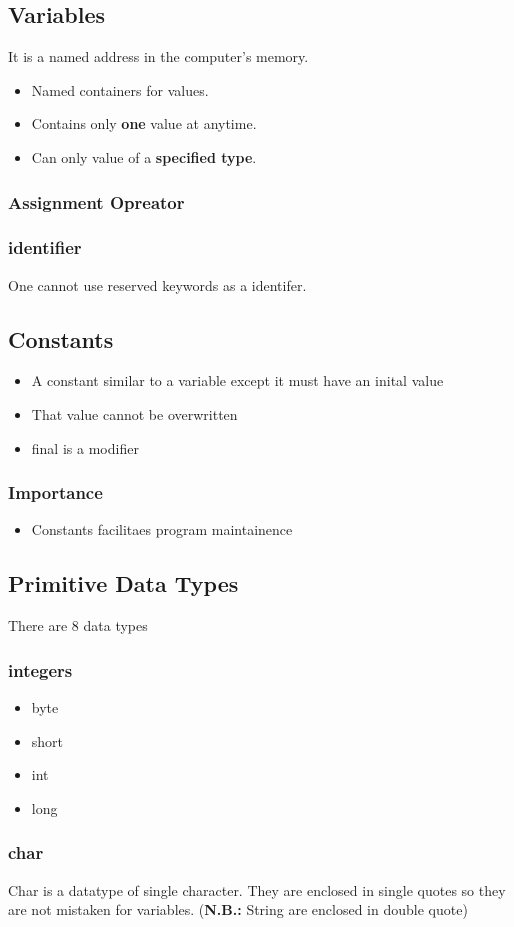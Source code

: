 \documentclass[12pt]{article}
\begin{document}
\subsection{Variables}
It is a named address in the computer's memory.
\begin{itemize}
\item Named containers for values.
\item Contains only \textbf{one} value at anytime.
\item Can only value of a \textbf{specified type}.
\end{itemize}
\subsubsection{Assignment Opreator}
\subsubsection{identifier}
One cannot use reserved keywords as a identifer.
\subsection{Constants}
\begin{itemize}
\item A constant similar to a variable except it must have an inital value
\item That value cannot be overwritten
\item final is a modifier
\end{itemize}
\subsubsection{Importance}
\begin{itemize}
\item Constants facilitaes program maintainence 
\end{itemize}

\pagebreak

\subsection{Primitive Data Types}
There are 8 data types 
\subsubsection{integers}
\begin{itemize}
\item byte
\item short 
\item int
\item long
\end{itemize}
\subsubsection{char}
Char is a datatype of single character.
They are enclosed in single quotes so they are not mistaken for variables.
(\textbf{N.B.:} String are enclosed in double quote)
\end{document}
